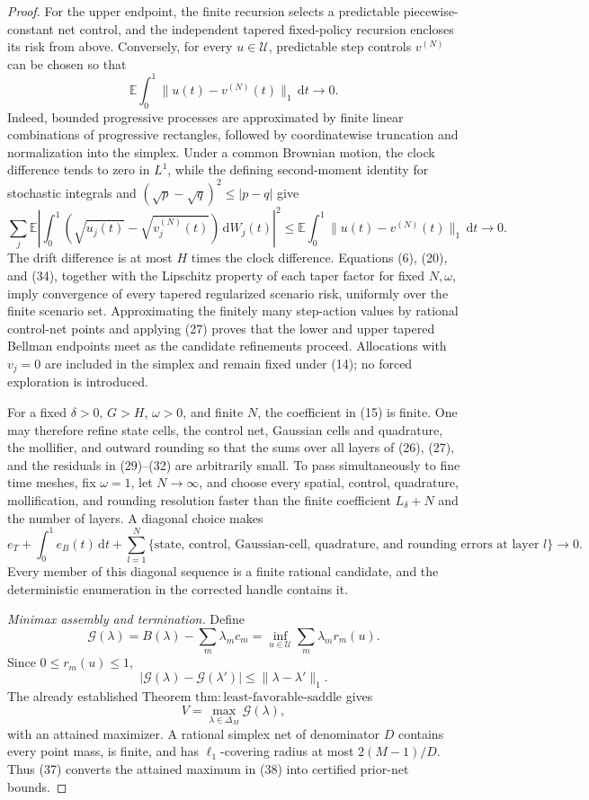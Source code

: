 \documentclass{article}
\begin{document}
\begin{proof}
For the upper endpoint, the finite recursion selects a predictable piecewise-constant net control, and the independent tapered fixed-policy recursion encloses its risk from above.  Conversely, for every \(u\in\mathcal U\), predictable step controls \(v^{(N)}\) can be chosen so that
\[
 \mathbb E\int_0^1\|u(t)-v^{(N)}(t)\|_1\,\mathrm dt\longrightarrow0.
 \tag{33}
\]
Indeed, bounded progressive processes are approximated by finite linear combinations of progressive rectangles, followed by coordinatewise truncation and normalization into the simplex.  Under a common Brownian motion, the clock difference tends to zero in \(L^1\), while the defining second-moment identity for stochastic integrals and \((\sqrt p-\sqrt q)^2\leq|p-q|\) give
\[
 \sum_j\mathbb E\left|
 \int_0^1(\sqrt{u_j(t)}-\sqrt{v_j^{(N)}(t)})\,\mathrm dW_j(t)
 \right|^2
 \leq\mathbb E\int_0^1\|u(t)-v^{(N)}(t)\|_1\,\mathrm dt
 \longrightarrow0.
 \tag{34}
\]
The drift difference is at most \(H\) times the clock difference.  Equations (6), (20), and (34), together with the Lipschitz property of each taper factor for fixed \(N,\omega\), imply convergence of every tapered regularized scenario risk, uniformly over the finite scenario set.  Approximating the finitely many step-action values by rational control-net points and applying (27) proves that the lower and upper tapered Bellman endpoints meet as the candidate refinements proceed.  Allocations with \(v_j=0\) are included in the simplex and remain fixed under (14); no forced exploration is introduced.

For a fixed \(\delta>0\), \(G>H\), \(\omega>0\), and finite \(N\), the coefficient in (15) is finite.  One may therefore refine state cells, the control net, Gaussian cells and quadrature, the mollifier, and outward rounding so that the sums over all layers of (26), (27), and the residuals in (29)--(32) are arbitrarily small.  To pass simultaneously to fine time meshes, fix \(\omega=1\), let \(N\to\infty\), and choose every spatial, control, quadrature, mollification, and rounding resolution faster than the finite coefficient \(L_\delta+N\) and the number of layers.  A diagonal choice makes
\[
 e_T+\int_0^1e_B(t)\,\mathrm dt+
 \sum_{l=1}^N\{\text{state, control, Gaussian-cell, quadrature, and rounding errors at layer }l\}
 \longrightarrow0.
 \tag{35}
\]
Every member of this diagonal sequence is a finite rational candidate, and the deterministic enumeration in the corrected handle contains it.

\emph{Minimax assembly and termination.}
Define
\[
 \mathcal G(\lambda)=B(\lambda)-\sum_m\lambda_mc_m
 =\inf_{u\in\mathcal U}\sum_m\lambda_mr_m(u).
 \tag{36}
\]
Since \(0\leq r_m(u)\leq1\),
\[
 |\mathcal G(\lambda)-\mathcal G(\lambda')|
 \leq\|\lambda-\lambda'\|_1.
 \tag{37}
\]
The already established Theorem \(\mathrm{thm{:}least\text{-}favorable\text{-}saddle}\) gives
\[
 V=\max_{\lambda\in\Delta_M}\mathcal G(\lambda),
 \tag{38}
\]
with an attained maximizer.  A rational simplex net of denominator \(D\) contains every point mass, is finite, and has \(\ell_1\)-covering radius at most \(2(M-1)/D\).  Thus (37) converts the attained maximum in (38) into certified prior-net bounds.


\end{proof}
\end{document}
